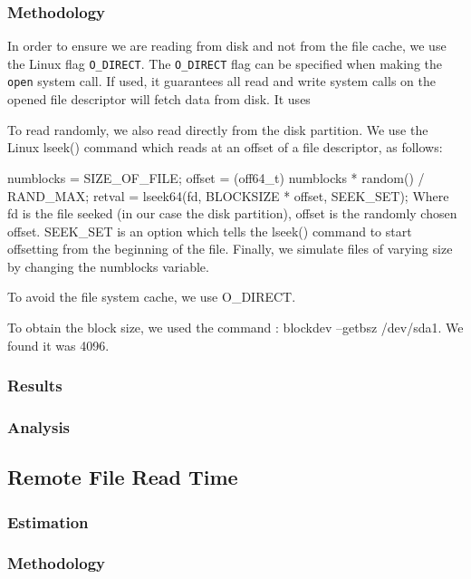 \subsubsection{Methodology}

In order to ensure we are reading from disk and not from the file cache, we use the Linux flag \texttt{O\_DIRECT}. The \texttt{O\_DIRECT} flag can be specified when making the \texttt{open} system call. If used, it guarantees all read and write system calls on the opened file descriptor will fetch data from disk. It uses 

To read randomly, we also read directly from the disk partition. We use the Linux lseek() command which reads at an offset of a file descriptor, as follows:

numblocks = SIZE_OF_FILE;
offset = (off64_t) numblocks * random() / RAND_MAX;
retval = lseek64(fd, BLOCKSIZE * offset, SEEK_SET);
Where fd is the file seeked (in our case the disk partition), offset is the randomly chosen offset. SEEK_SET is an option which tells the lseek() command to start offsetting from the beginning of the file. Finally, we simulate files of varying size by changing the numblocks variable.

To avoid the file system cache, we use O_DIRECT.

To obtain the block size, we used the command : blockdev --getbsz /dev/sda1. We found it was 4096.

\subsubsection{Results}


\subsubsection{Analysis}

\subsection{Remote File Read Time}

\subsubsection{Estimation}

\subsubsection{Methodology}

